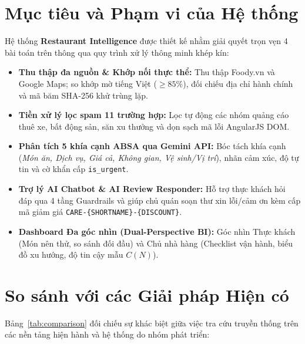 \documentclass[12pt, a4paper, oneside]{book}
\begin{document}
\section{Mục tiêu và Phạm vi của Hệ thống}
Hệ thống \textbf{Restaurant Intelligence} được thiết kế nhằm giải quyết trọn vẹn 4 bài toán trên thông qua quy trình xử lý thông minh khép kín:
\begin{itemize}
    \item \textbf{Thu thập đa nguồn \& Khớp nối thực thể:} Thu thập Foody.vn và Google Maps; so khớp mờ tiếng Việt ($\ge 85\%$), đối chiếu địa chỉ hành chính và mã băm SHA-256 khử trùng lặp.
    \item \textbf{Tiền xử lý lọc spam 11 trường hợp:} Lọc tự động các nhóm quảng cáo thuê xe, bất động sản, săn xu thưởng và dọn sạch mã lỗi AngularJS DOM.
    \item \textbf{Phân tích 5 khía cạnh ABSA qua Gemini API:} Bóc tách khía cạnh (\textit{Món ăn, Dịch vụ, Giá cả, Không gian, Vệ sinh/Vị trí}), nhãn cảm xúc, độ tự tin và cờ khẩn cấp \texttt{is\_urgent}.
    \item \textbf{Trợ lý AI Chatbot \& AI Review Responder:} Hỗ trợ thực khách hỏi đáp qua 4 tầng Guardrails và giúp chủ quán soạn thư xin lỗi/cảm ơn kèm cấp mã giảm giá \texttt{CARE-\{SHORTNAME\}-\{DISCOUNT\}}.
    \item \textbf{Dashboard Đa góc nhìn (Dual-Perspective BI):} Góc nhìn Thực khách (Món nên thử, so sánh đối đầu) và Chủ nhà hàng (Checklist vận hành, biểu đồ xu hướng, độ tin cậy mẫu $C(N)$).
\end{itemize}

\section{So sánh với các Giải pháp Hiện có}
Bảng~\ref{tab:comparison} đối chiếu sự khác biệt giữa việc tra cứu truyền thống trên các nền tảng hiện hành và hệ thống do nhóm phát triển:
\end{document}

